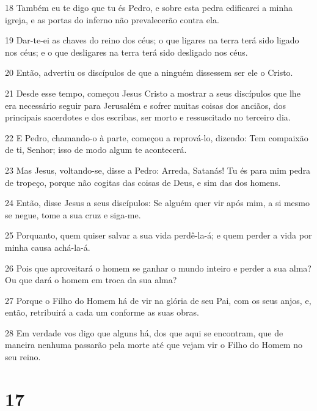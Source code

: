 \par 18 Também eu te digo que tu és Pedro, e sobre esta pedra edificarei a minha igreja, e as portas do inferno não prevalecerão contra ela.
\par 19 Dar-te-ei as chaves do reino dos céus; o que ligares na terra terá sido ligado nos céus; e o que desligares na terra terá sido desligado nos céus.
\par 20 Então, advertiu os discípulos de que a ninguém dissessem ser ele o Cristo.
\par 21 Desde esse tempo, começou Jesus Cristo a mostrar a seus discípulos que lhe era necessário seguir para Jerusalém e sofrer muitas coisas dos anciãos, dos principais sacerdotes e dos escribas, ser morto e ressuscitado no terceiro dia.
\par 22 E Pedro, chamando-o à parte, começou a reprová-lo, dizendo: Tem compaixão de ti, Senhor; isso de modo algum te acontecerá.
\par 23 Mas Jesus, voltando-se, disse a Pedro: Arreda, Satanás! Tu és para mim pedra de tropeço, porque não cogitas das coisas de Deus, e sim das dos homens.
\par 24 Então, disse Jesus a seus discípulos: Se alguém quer vir após mim, a si mesmo se negue, tome a sua cruz e siga-me.
\par 25 Porquanto, quem quiser salvar a sua vida perdê-la-á; e quem perder a vida por minha causa achá-la-á.
\par 26 Pois que aproveitará o homem se ganhar o mundo inteiro e perder a sua alma? Ou que dará o homem em troca da sua alma?
\par 27 Porque o Filho do Homem há de vir na glória de seu Pai, com os seus anjos, e, então, retribuirá a cada um conforme as suas obras.
\par 28 Em verdade vos digo que alguns há, dos que aqui se encontram, que de maneira nenhuma passarão pela morte até que vejam vir o Filho do Homem no seu reino.

\chapter{17}

